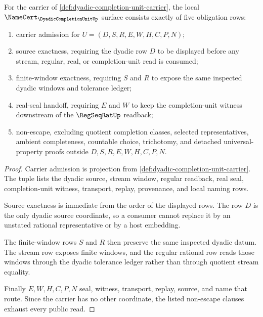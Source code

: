 \begin{theorem}
\label{thm:dyadic-completion-unit-namecert-obligations}
For the carrier of \autoref{def:dyadic-completion-unit-carrier}, the local $\NameCert_{\DyadicCompletionUnitUp}$ surface consists exactly of five obligation rows:
\begin{enumerate}
\item carrier admission for $U=(D,S,R,E,W,H,C,P,N)$;
\item source exactness, requiring the dyadic row $D$ to be displayed before any stream, regular, real, or completion-unit read is consumed;
\item finite-window exactness, requiring $S$ and $R$ to expose the same inspected dyadic windows and tolerance ledger;
\item real-seal handoff, requiring $E$ and $W$ to keep the completion-unit witness downstream of the $\RegSeqRatUp$ readback;
\item non-escape, excluding quotient completion classes, selected representatives, ambient completeness, countable choice, trichotomy, and detached universal-property proofs outside $D,S,R,E,W,H,C,P,N$.
\end{enumerate}
\end{theorem}
\begin{proof}
Carrier admission is projection from \autoref{def:dyadic-completion-unit-carrier}. The tuple lists the dyadic source, stream window, regular readback, real seal, completion-unit witness, transport, replay, provenance, and local naming rows.

Source exactness is immediate from the order of the displayed rows. The row $D$ is the only dyadic source coordinate, so a consumer cannot replace it by an unstated rational representative or by a host embedding.

The finite-window rows $S$ and $R$ then preserve the same inspected dyadic datum. The stream row exposes finite windows, and the regular rational row reads those windows through the dyadic tolerance ledger rather than through quotient stream equality.

Finally $E,W,H,C,P,N$ seal, witness, transport, replay, source, and name that route. Since the carrier has no other coordinate, the listed non-escape clauses exhaust every public read.
\end{proof}

